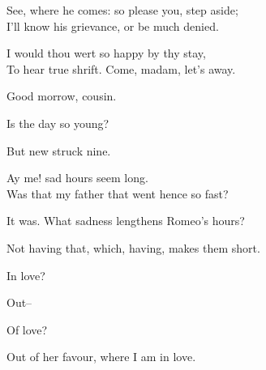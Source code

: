 \begin{speech}
See, where he comes: so please you, step aside; \\

I'll know his grievance, or be much denied. \\
\end{speech}
\begin{speech}
 I would thou wert so happy by thy stay, \\
To hear true shrift.   Come, madam, let's away.  \\
\end{speech}
\begin{speech}
Good morrow, cousin. \\
\end{speech}
\begin{speech}
Is the day so young? \\
\end{speech}
\begin{speech}
But new struck nine. \\
\end{speech}
\begin{speech}
Ay me! sad hours seem long. \\
Was that my father that went hence so fast? \\
\end{speech}
\begin{speech}
It was.   What sadness lengthens Romeo's hours? \\

\end{speech}
\begin{speech}
Not having that, which, having, makes them short.
\\
\end{speech}
\begin{speech}
In love? \\
\end{speech}
\begin{speech}
Out-- \\
\end{speech}
\begin{speech}
Of love? \\
\end{speech}
\begin{speech}
Out of her favour, where I am in love. \\
\end{speech}

